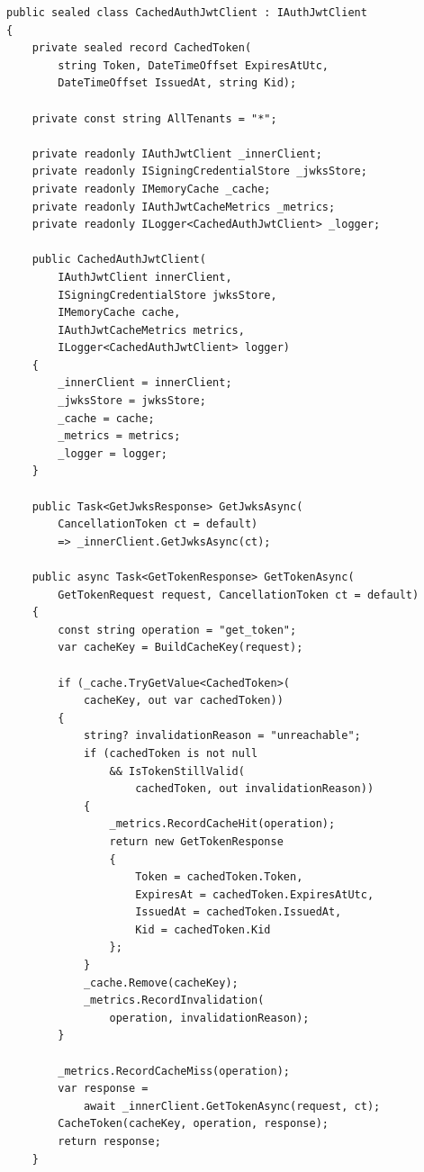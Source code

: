 \begin{lstlisting}[language={[Sharp]C},
  label={lst:app-cached-client},
  caption={Класс CachedAuthJwtClient: кеширование токенов с учётом ротации}]
public sealed class CachedAuthJwtClient : IAuthJwtClient
{
    private sealed record CachedToken(
        string Token, DateTimeOffset ExpiresAtUtc,
        DateTimeOffset IssuedAt, string Kid);

    private const string AllTenants = "*";

    private readonly IAuthJwtClient _innerClient;
    private readonly ISigningCredentialStore _jwksStore;
    private readonly IMemoryCache _cache;
    private readonly IAuthJwtCacheMetrics _metrics;
    private readonly ILogger<CachedAuthJwtClient> _logger;

    public CachedAuthJwtClient(
        IAuthJwtClient innerClient,
        ISigningCredentialStore jwksStore,
        IMemoryCache cache,
        IAuthJwtCacheMetrics metrics,
        ILogger<CachedAuthJwtClient> logger)
    {
        _innerClient = innerClient;
        _jwksStore = jwksStore;
        _cache = cache;
        _metrics = metrics;
        _logger = logger;
    }

    public Task<GetJwksResponse> GetJwksAsync(
        CancellationToken ct = default)
        => _innerClient.GetJwksAsync(ct);

    public async Task<GetTokenResponse> GetTokenAsync(
        GetTokenRequest request, CancellationToken ct = default)
    {
        const string operation = "get_token";
        var cacheKey = BuildCacheKey(request);

        if (_cache.TryGetValue<CachedToken>(
            cacheKey, out var cachedToken))
        {
            string? invalidationReason = "unreachable";
            if (cachedToken is not null
                && IsTokenStillValid(
                    cachedToken, out invalidationReason))
            {
                _metrics.RecordCacheHit(operation);
                return new GetTokenResponse
                {
                    Token = cachedToken.Token,
                    ExpiresAt = cachedToken.ExpiresAtUtc,
                    IssuedAt = cachedToken.IssuedAt,
                    Kid = cachedToken.Kid
                };
            }
            _cache.Remove(cacheKey);
            _metrics.RecordInvalidation(
                operation, invalidationReason);
        }

        _metrics.RecordCacheMiss(operation);
        var response =
            await _innerClient.GetTokenAsync(request, ct);
        CacheToken(cacheKey, operation, response);
        return response;
    }


\end{lstlisting}
